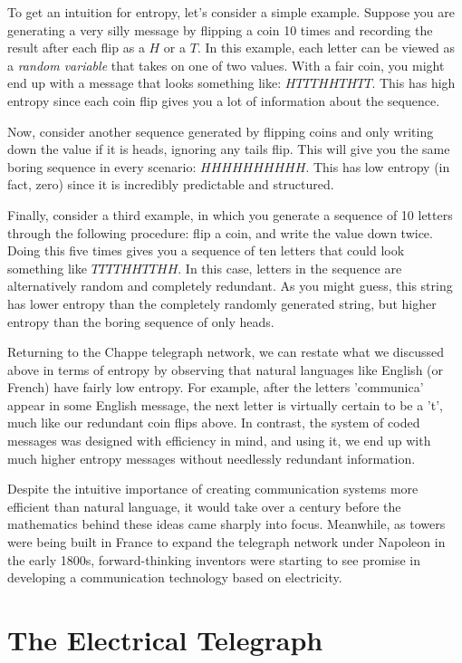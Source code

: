 \documentclass[UTF8]{book}
\begin{document}
\begin{CJK}{UTF8}{gbsn}
To get an intuition for entropy, let's consider a simple example. Suppose you are generating a very silly message by flipping a coin 10 times and recording the result after each flip as a $H$ or a $T$. In this example, each letter can be viewed as a \emph{random variable} that takes on one of two values. With a fair coin, you might end up with a message that looks something like: $HTTTHHTHTT$. This has high entropy since each coin flip gives you a lot of information about the sequence.

Now, consider another sequence generated by flipping coins and only writing down the value if it is heads, ignoring any tails flip. This will give you the same boring sequence in every scenario: $HHHHHHHHHH$. This has low entropy (in fact, zero) since it is incredibly predictable and structured.

Finally, consider a third example, in which you generate a sequence of 10 letters through the following procedure: flip a coin, and write the value down twice. Doing this five times gives you a sequence of ten letters that could look something like $TTTTHHTTHH$. In this case, letters in the sequence are alternatively random and completely redundant. As you might guess, this string has lower entropy than the completely randomly generated string, but higher entropy than the boring sequence of only heads.

Returning to the Chappe telegraph network, we can restate what we discussed above in terms of entropy by observing that natural languages like English (or French) have fairly low entropy. For example, after the letters 'communica' appear in some English message, the next letter is virtually certain to be a 't', much like our redundant coin flips above. In contrast, the system of coded messages was designed with efficiency in mind, and using it, we end up with much higher entropy messages without needlessly redundant information.

Despite the intuitive importance of creating communication systems more efficient than natural language, it would take over a century before the mathematics behind these ideas came sharply into focus. Meanwhile, as towers were being built in France to expand the telegraph network under Napoleon in the early 1800s, forward-thinking inventors were starting to see promise in developing a communication technology based on electricity.

\chapter{The Electrical Telegraph}


\end{CJK}
\end{document}
